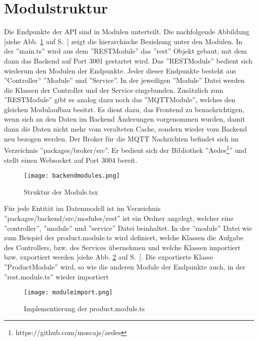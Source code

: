 \section{Modulstruktur}
Die Endpunkte der API sind in Modulen unterteilt. Die nachfolgende Abbildung [siehe Abb. \ref{fig: backendmodules} auf S.~\pageref{fig: backendmodules}] zeigt die hierarchische Beziehung unter den Modulen. In der ''main.ts'' wird aus dem ''RESTModule'' das ''rest'' Objekt gebaut, mit dem dann das Backend auf Port 3001 gestartet wird. Das ''RESTModule'' bedient sich wiederum den Modulen der Endpunkte. Jeder dieser Endpunkte besteht aus ''Controller'' ''Module'' und ''Service''. In der jeweiligen ''Module'' Datei werden die Klassen der Controller und der Service eingebunden. Zusätzlich zum ''RESTModule'' gibt es analog dazu noch das ''MQTTModule'', welches den gleichen Modulaufbau besitzt. Es dient dazu, das Frontend zu benachrichtigen, wenn sich an den Daten im Backend Änderungen vorgenommen wurden, damit dann die Daten nicht mehr vom veralteten Cache, sondern wieder vom Backend neu bezogen werden. Der Broker für die MQTT Nachrichten befindet sich im Verzeichnis ''packages/broker/src''. Er bedient sich der Bibliothek ''Aedes\footnote{https://github.com/moscajs/aedes}'' und stellt einen Websocket auf Port 3004 bereit. 

\begin{figure}[h]
    \centering
    \texttt{[image: backendmodules.png]}
    \caption{Struktur der Module.tsx}
    \label{fig: backendmodules}
\end{figure}

Für jede Entität im Datenmodell ist im Verzeichnis ''packages/backend/src/modules/rest'' ist ein Ordner angelegt, welcher eine ''controller'', ''module'' und ''service'' Datei beinhaltet. In der ''module'' Datei wie zum Beispiel der product.module.ts wird definiert, welche Klassen die Aufgabe des Controllers, bzw. des Services übernehmen und welche Klassen importiert bzw. exportiert werden [siehe Abb. \ref{fig: moduleimport} auf S.~\pageref{fig: moduleimport}]. Die exportierte Klasse ''ProductModule'' wird, so wie die anderen Module der Endpunkte auch, in der ''rest.module.ts'' wieder importiert

\begin{figure}[h]
    \centering
    \texttt{[image: moduleimport.png]}
    \caption{Implementierung der product.module.ts}
    \label{fig: moduleimport}
\end{figure}

